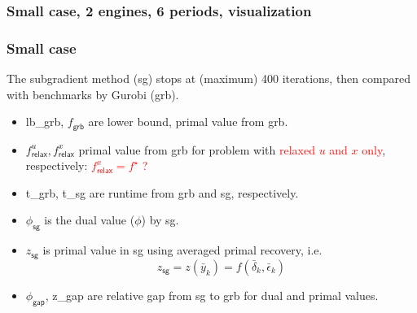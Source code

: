 \begin{frame}
  \frametitle{Small case, 2 engines, 6 periods, visualization}
  \begin{figure}
  \end{figure}
\end{frame}

\begin{frame}
  \frametitle{Small case}

  The subgradient method (sg) stops at (maximum) 400 iterations, then compared with benchmarks by Gurobi (grb).
  \begin{itemize}
    \item lb\_grb, \(f_{\textsf{grb}}\)  are lower bound, primal value from grb.
    \item \(f^u_{\textsf{relax}}, f^x_{\textsf{relax}}\) primal value from grb for problem with \textcolor{red}{relaxed \(u\) and \(x\) only}, respectively: \textcolor{red}{\(f^x_{\textsf{relax}} = f^\star\) ?}
    \item t\_grb, t\_sg are runtime from grb and sg, respectively.
    \item \(\phi_{\textsf{sg}}\) is the dual value (\(\phi\)) by sg.
    \item \(z_{\textsf{sg}}\) is primal value in sg using averaged primal recovery, i.e.
          \[z_{\textsf{sg}} = z(\bar y_k) = f(\bar \delta_k, \bar \epsilon_k)\]
    \item \(\phi_{\textsf{gap}}\), z\_gap are relative gap from sg to grb for dual and primal values.
  \end{itemize}
\end{frame}

